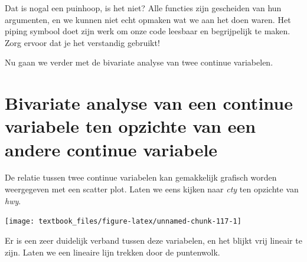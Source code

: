 \documentclass[]{tufte-book}
\newenvironment{Shaded}{}{}
\newcommand{\DataTypeTok}[1]{\textcolor[rgb]{0.56,0.13,0.00}{#1}}
\newcommand{\KeywordTok}[1]{\textcolor[rgb]{0.00,0.44,0.13}{\textbf{#1}}}
\newcommand{\NormalTok}[1]{#1}
\newcommand{\OperatorTok}[1]{\textcolor[rgb]{0.40,0.40,0.40}{#1}}
\newcommand{\StringTok}[1]{\textcolor[rgb]{0.25,0.44,0.63}{#1}}
\begin{document}
Dat is nogal een puinhoop, is het niet? Alle functies zijn gescheiden van hun argumenten, en we kunnen niet echt opmaken wat we aan het doen waren. Het piping symbool doet zijn werk om onze code leesbaar en begrijpelijk te maken. Zorg ervoor dat je het verstandig gebruikt!

Nu gaan we verder met de bivariate analyse van twee continue variabelen.

\hypertarget{bivariate-analyse-van-een-continue-variabele-ten-opzichte-van-een-andere-continue-variabele}{%
\section{Bivariate analyse van een continue variabele ten opzichte van een andere continue variabele}\label{bivariate-analyse-van-een-continue-variabele-ten-opzichte-van-een-andere-continue-variabele}}

De relatie tussen twee continue variabelen kan gemakkelijk grafisch worden weergegeven met een scatter plot. Laten we eens kijken naar \emph{cty} ten opzichte van \emph{hwy}.

\begin{Shaded}
\end{Shaded}

\texttt{[image: textbook\_files/figure-latex/unnamed-chunk-117-1]}

Er is een zeer duidelijk verband tussen deze variabelen, en het blijkt vrij lineair te zijn. Laten we een lineaire lijn trekken door de puntenwolk.

\begin{Shaded}
\end{Shaded}
\end{document}
